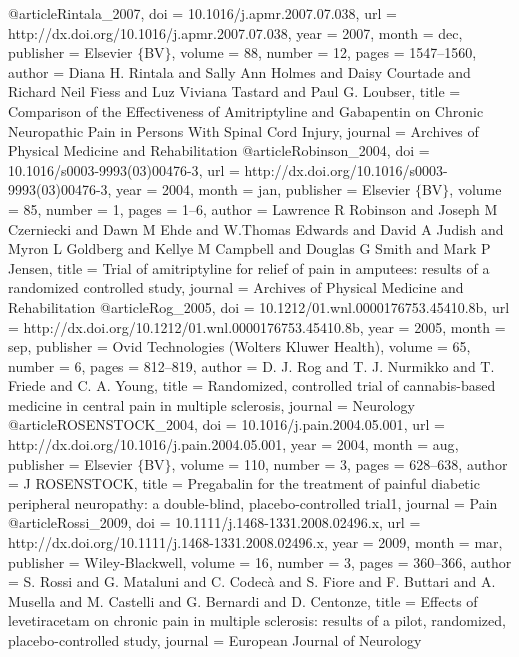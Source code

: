@article{Rintala_2007,
	doi = {10.1016/j.apmr.2007.07.038},
	url = {http://dx.doi.org/10.1016/j.apmr.2007.07.038},
	year = 2007,
	month = {dec},
	publisher = {Elsevier $\lbrace$BV$\rbrace$},
	volume = {88},
	number = {12},
	pages = {1547--1560},
	author = {Diana H. Rintala and Sally Ann Holmes and Daisy Courtade and Richard Neil Fiess and Luz Viviana Tastard and Paul G. Loubser},
	title = {Comparison of the Effectiveness of Amitriptyline and Gabapentin on Chronic Neuropathic Pain in Persons With Spinal Cord Injury},
	journal = {Archives of Physical Medicine and Rehabilitation}
}
@article{Robinson_2004,
	doi = {10.1016/s0003-9993(03)00476-3},
	url = {http://dx.doi.org/10.1016/s0003-9993(03)00476-3},
	year = 2004,
	month = {jan},
	publisher = {Elsevier $\lbrace$BV$\rbrace$},
	volume = {85},
	number = {1},
	pages = {1--6},
	author = {Lawrence R Robinson and Joseph M Czerniecki and Dawn M Ehde and W.Thomas Edwards and David A Judish and Myron L Goldberg and Kellye M Campbell and Douglas G Smith and Mark P Jensen},
	title = {Trial of amitriptyline for relief of pain in amputees: results of a randomized controlled study},
	journal = {Archives of Physical Medicine and Rehabilitation}
}
@article{Rog_2005,
	doi = {10.1212/01.wnl.0000176753.45410.8b},
	url = {http://dx.doi.org/10.1212/01.wnl.0000176753.45410.8b},
	year = 2005,
	month = {sep},
	publisher = {Ovid Technologies (Wolters Kluwer Health)},
	volume = {65},
	number = {6},
	pages = {812--819},
	author = {D. J. Rog and T. J. Nurmikko and T. Friede and C. A. Young},
	title = {Randomized, controlled trial of cannabis-based medicine in central pain in multiple sclerosis},
	journal = {Neurology}
}
@article{ROSENSTOCK_2004,
	doi = {10.1016/j.pain.2004.05.001},
	url = {http://dx.doi.org/10.1016/j.pain.2004.05.001},
	year = 2004,
	month = {aug},
	publisher = {Elsevier $\lbrace$BV$\rbrace$},
	volume = {110},
	number = {3},
	pages = {628--638},
	author = {J ROSENSTOCK},
	title = {Pregabalin for the treatment of painful diabetic peripheral neuropathy: a double-blind, placebo-controlled trial{\ast}1},
	journal = {Pain}
}
@article{Rossi_2009,
	doi = {10.1111/j.1468-1331.2008.02496.x},
	url = {http://dx.doi.org/10.1111/j.1468-1331.2008.02496.x},
	year = 2009,
	month = {mar},
	publisher = {Wiley-Blackwell},
	volume = {16},
	number = {3},
	pages = {360--366},
	author = {S. Rossi and G. Mataluni and C. Codec{\`{a}} and S. Fiore and F. Buttari and A. Musella and M. Castelli and G. Bernardi and D. Centonze},
	title = {Effects of levetiracetam on chronic pain in multiple sclerosis: results of a pilot, randomized, placebo-controlled study},
	journal = {European Journal of Neurology}
}

